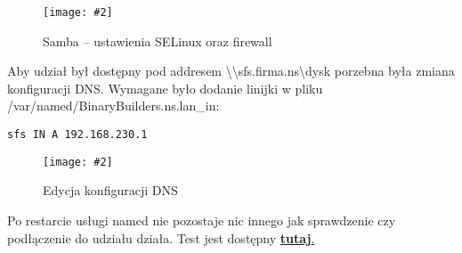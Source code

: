 \documentclass[a4paper]{article}
\newcommand*{\zdj}[2][\textwidth]{\texttt{[image: \#2]}}
\newcommand*{\fg}[4][!htb]{
      \begin{figure*}[#1]
            \zdj{#2}
            \caption[#4]{#3}
      \end{figure*}
}
\begin{document}
      
      
\fg{contents/configuration/Samba/4.png}{Samba – ustawienia SELinux oraz firewall}{Samba – ustawienia SELinux oraz firewall}

Aby udział był dostępny pod addresem \textbackslash \textbackslash sfs.firma.ns\textbackslash dysk porzebna była zmiana konfiguracji DNS. Wymagane było dodanie linijki w pliku /var/named/BinaryBuilders.ns.lan\_in: 
\begin{Verbatim}[frame=single]
sfs IN A 192.168.230.1
\end{Verbatim}
\fg{contents/configuration/Samba/5 - edycja BinaryBuilders.ns.lan_in.png}{Edycja konfiguracji DNS}{Edycja konfiguracji DNS}

Po restarcie usługi named nie pozostaje nic innego jak sprawdzenie czy podłączenie do udziału działa. Test jest dostępny \hyperref[fig:samba-try-connection]{\textbf{tutaj}.}



\newpage
\end{document}
